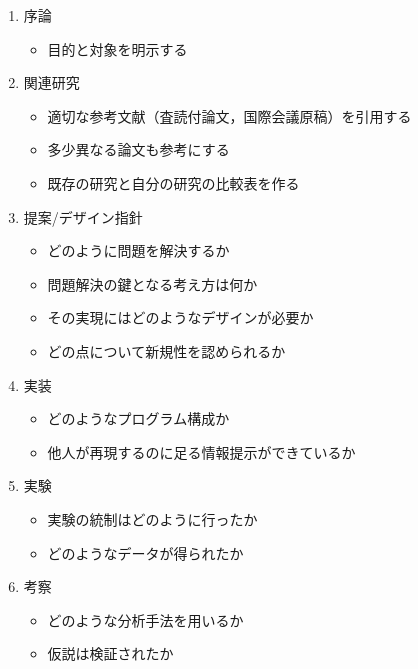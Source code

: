 \documentclass[a4j]{matsushita-zemi}
\begin{document}
\begin{small}
  \begin{framed}
    \begin{enumerate}

    \item 序論 
      \begin{itemize}
      \item 目的と対象を明示する
      \end{itemize}

    \item 関連研究
      \begin{itemize}
      \item 適切な参考文献（査読付論文，国際会議原稿）を引用する
      \item 多少異なる論文も参考にする
      \item 既存の研究と自分の研究の比較表を作る
      \end{itemize}
      
    \item 提案/デザイン指針
      \begin{itemize}
      \item どのように問題を解決するか
      \item 問題解決の鍵となる考え方は何か
      \item その実現にはどのようなデザインが必要か
      \item どの点について新規性を認められるか
      \end{itemize}
      
    \item 実装
      \begin{itemize}
      \item どのようなプログラム構成か
      \item 他人が再現するのに足る情報提示ができているか
      \end{itemize}
      
    \item 実験
      \begin{itemize}
      \item 実験の統制はどのように行ったか
      \item どのようなデータが得られたか
      \end{itemize}
      
    \item 考察
      \begin{itemize}
      \item どのような分析手法を用いるか
      \item 仮説は検証されたか
      \end{itemize}
      

\end{enumerate}
\end{framed}
\end{small}
\end{document}
